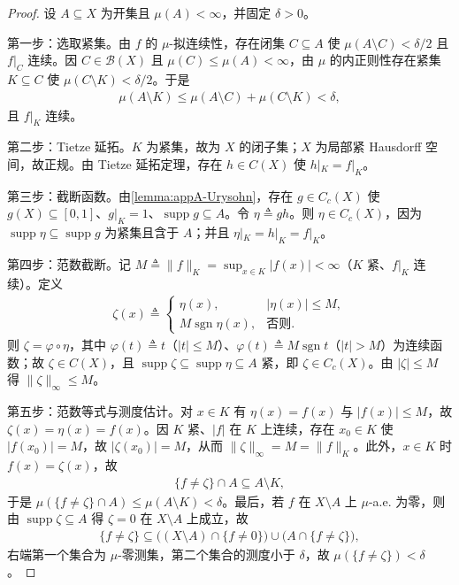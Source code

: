 \documentclass[../../main.tex]{subfiles}%
\begin{document}
\begin{proof}
设 $A\subseteq X$ 为开集且 $\mu(A)<\infty$，并固定 $\delta>0$。

第一步：选取紧集。由 $f$ 的 $\mu$-拟连续性，存在闭集 $C\subseteq A$ 使 $\mu(A\setminus C)<\delta/2$ 且 $f|_C$ 连续。因 $C\in\mathscr B(X)$ 且 $\mu(C)\leqslant\mu(A)<\infty$，由 $\mu$ 的内正则性存在紧集 $K\subseteq C$ 使 $\mu(C\setminus K)<\delta/2$。于是
\begin{align*}
\mu(A\setminus K)\leqslant\mu(A\setminus C)+\mu(C\setminus K)<\delta,
\end{align*}
且 $f|_K$ 连续。

第二步：Tietze 延拓。$K$ 为紧集，故为 $X$ 的闭子集；$X$ 为局部紧 Hausdorff 空间，故正规。由 Tietze 延拓定理，存在 $h\in C(X)$ 使 $h|_K=f|_K$。

第三步：截断函数。由\cref{lemma:appA-Urysohn}，存在 $g\in C_c(X)$ 使 $g(X)\subseteq[0,1]$、$g|_K=1$、$\operatorname{supp}g\subseteq A$。令 $\eta\triangleq gh$。则 $\eta\in C_c(X)$，因为 $\operatorname{supp}\eta\subseteq\operatorname{supp}g$ 为紧集且含于 $A$；并且 $\eta|_K=h|_K=f|_K$。

第四步：范数截断。记 $M\triangleq\|f\|_K=\sup_{x\in K}|f(x)|<\infty$（$K$ 紧、$f|_K$ 连续）。定义
\begin{align*}
\zeta(x)\triangleq
\begin{cases}
\eta(x), & |\eta(x)|\leqslant M,\\
M\operatorname{sgn}\eta(x), & \text{否则}.
\end{cases}
\end{align*}
则 $\zeta=\varphi\circ\eta$，其中 $\varphi(t)\triangleq t$（$|t|\leqslant M$）、$\varphi(t)\triangleq M\operatorname{sgn}t$（$|t|>M$）为连续函数；故 $\zeta\in C(X)$，且 $\operatorname{supp}\zeta\subseteq\operatorname{supp}\eta\subseteq A$ 紧，即 $\zeta\in C_c(X)$。由 $|\zeta|\leqslant M$ 得 $\|\zeta\|_\infty\leqslant M$。

第五步：范数等式与测度估计。对 $x\in K$ 有 $\eta(x)=f(x)$ 与 $|f(x)|\leqslant M$，故 $\zeta(x)=\eta(x)=f(x)$。因 $K$ 紧、$|f|$ 在 $K$ 上连续，存在 $x_0\in K$ 使 $|f(x_0)|=M$，故 $|\zeta(x_0)|=M$，从而 $\|\zeta\|_\infty=M=\|f\|_K$。此外，$x\in K$ 时 $f(x)=\zeta(x)$，故
\begin{align*}
\{f\neq\zeta\}\cap A\subseteq A\setminus K,
\end{align*}
于是 $\mu(\{f\neq\zeta\}\cap A)\leqslant\mu(A\setminus K)<\delta$。最后，若 $f$ 在 $X\setminus A$ 上 $\mu$-a.e. 为零，则由 $\operatorname{supp}\zeta\subseteq A$ 得 $\zeta=0$ 在 $X\setminus A$ 上成立，故
\begin{align*}
\{f\neq\zeta\}\subseteq\bigl((X\setminus A)\cap\{f\neq0\}\bigr)\cup\bigl(A\cap\{f\neq\zeta\}\bigr),
\end{align*}
右端第一个集合为 $\mu$-零测集，第二个集合的测度小于 $\delta$，故 $\mu(\{f\neq\zeta\})<\delta$。
\end{proof}
\end{document}
